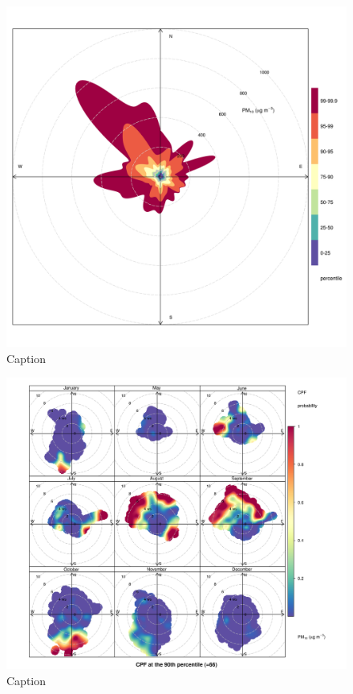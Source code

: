 \documentclass{nwureport}
\begin{document}
\begin{figure}[!htb]
    \centering
    \includegraphics[width=\textwidth]{images/Wedela_PM10_percentileRose.png}
    \caption{Caption}
    \label{fig:summary}
\end{figure}

\begin{figure}[!htb]
    \centering
    \includegraphics[width=\textwidth]{images/Wedela_PM10_polar.png}
    \caption{Caption}
    \label{fig:summary}
\end{figure}
\end{document}
